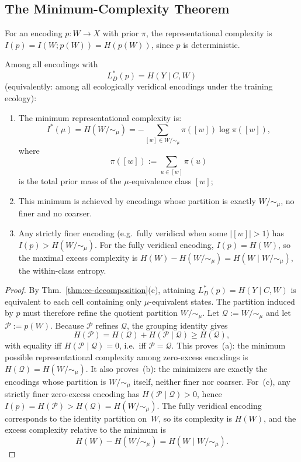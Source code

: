 \documentclass[twoside,11pt]{article}
\newcommand{\thmref}[1]{Thm.~\ref{#1}}
\begin{document}
\subsection{The Minimum-Complexity Theorem}

\begin{definition}
For an encoding $p \colon W \to X$ with prior $\pi$, the representational complexity is $I(p) = I(W; p(W)) = H(p(W))$, since $p$ is deterministic.
\end{definition}

\begin{theorem}\label{thm:min-complexity}
Among all encodings with
\[
L_D^*(p) = H(Y \mid C,W)
\]
(equivalently: among all ecologically veridical encodings under the training ecology):
\begin{enumerate}[label=(\alph*)]
\item The minimum representational complexity is:
\[
I^*(\mu) = H(W/{\sim_\mu}) = -\sum_{[w] \in W/{\sim_\mu}} \pi([w]) \log \pi([w]),
\]
where
\[
\pi([w]) := \sum_{u \in [w]} \pi(u)
\]
is the total prior mass of the $\mu$-equivalence class $[w]$;

\item This minimum is achieved by encodings whose partition is exactly $W/{\sim_\mu}$, no finer and no coarser.

\item Any strictly finer encoding (e.g.\ fully veridical when some $|[w]| > 1$) has $I(p) > H(W/{\sim_\mu})$. For the fully veridical encoding, $I(p) = H(W)$, so the maximal excess complexity is $H(W) - H(W/{\sim_\mu}) = H(W \mid W/{\sim_\mu})$, the within-class entropy.
\end{enumerate}
\end{theorem}

\begin{proof}
By \thmref{thm:ce-decomposition}(c), attaining $L_D^*(p)=H(Y \mid C,W)$ is equivalent to each cell containing only $\mu$-equivalent states. The partition induced by $p$ must therefore refine the quotient partition $W/{\sim_\mu}$. Let $\mathcal{Q} := W/{\sim_\mu}$ and let $\mathcal{P} := p(W)$. Because $\mathcal{P}$ refines $\mathcal{Q}$, the grouping identity gives
\[
H(\mathcal{P}) = H(\mathcal{Q}) + H(\mathcal{P} \mid \mathcal{Q}) \ge H(\mathcal{Q}),
\]
with equality iff $H(\mathcal{P} \mid \mathcal{Q})=0$, i.e.\ iff $\mathcal{P}=\mathcal{Q}$. This proves~(a): the minimum possible representational complexity among zero-excess encodings is $H(\mathcal{Q})=H(W/{\sim_\mu})$. It also proves~(b): the minimizers are exactly the encodings whose partition is $W/{\sim_\mu}$ itself, neither finer nor coarser. For~(c), any strictly finer zero-excess encoding has $H(\mathcal{P} \mid \mathcal{Q})>0$, hence $I(p)=H(\mathcal{P})>H(\mathcal{Q})=H(W/{\sim_\mu})$. The fully veridical encoding corresponds to the identity partition on~$W$, so its complexity is $H(W)$, and the excess complexity relative to the minimum is
\[
H(W) - H(W/{\sim_\mu}) = H(W \mid W/{\sim_\mu}).
\]
\end{proof}
\end{document}
